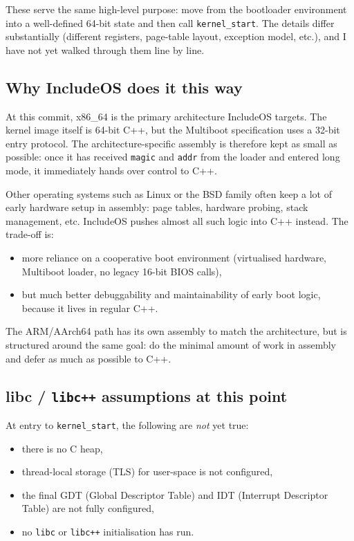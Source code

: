 \documentclass[a4paper,11pt]{article}
\begin{document}
These serve the same high-level purpose: move from the bootloader
environment into a well-defined 64-bit state and then call
\texttt{kernel\_start}. The details differ substantially (different
registers, page-table layout, exception model, etc.), and I have not yet
walked through them line by line.

\subsection{Why IncludeOS does it this way}

At this commit, x86\_64 is the primary architecture IncludeOS targets.
The kernel image itself is 64-bit C++, but the Multiboot specification
uses a 32-bit entry protocol. The architecture-specific assembly is
therefore kept as small as possible: once it has received
\texttt{magic} and \texttt{addr} from the loader and entered long mode,
it immediately hands over control to C++.

Other operating systems such as Linux or the BSD family often keep a lot
of early hardware setup in assembly: page tables, hardware probing,
stack management, etc. IncludeOS pushes almost all such logic into C++
instead. The trade-off is:

\begin{itemize}
  \item more reliance on a cooperative boot environment (virtualised
        hardware, Multiboot loader, no legacy 16-bit BIOS calls),
  \item but much better debuggability and maintainability of early boot
        logic, because it lives in regular C++.
\end{itemize}

The ARM/AArch64 path has its own assembly to match the architecture, but
is structured around the same goal: do the minimal amount of work in
assembly and defer as much as possible to C++.

\subsection{libc / \texorpdfstring{\texttt{libc++}}{libc++} assumptions at this point}

At entry to \texttt{kernel\_start}, the following are \emph{not} yet true:

\begin{itemize}
  \item there is no C heap,
  \item thread-local storage (TLS) for user-space is not configured,
  \item the final GDT (Global Descriptor Table) and IDT (Interrupt
        Descriptor Table) are not fully configured,
  \item no \texttt{libc} or \texttt{libc++} initialisation has run.
\end{itemize}
\end{document}
